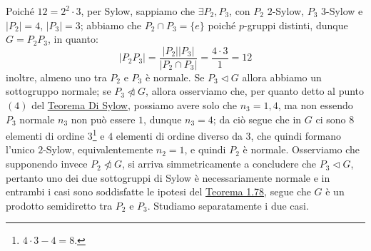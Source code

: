 \documentclass[11pt]{scrartcl}
\begin{document}
\begin{example}
    Poiché $12 = 2^2 \cdot 3$, per Sylow, sappiamo che $\exists P_2,P_3$, con $P_2$ $2$-Sylow, $P_3$ $3$-Sylow e $|P_2| = 4$, $|P_3| = 3$;
    abbiamo che $P_2 \cap P_3 = \{e\}$ poiché $p$-gruppi distinti, dunque $G = P_2P_3$, in quanto:
        \[ |P_2P_3| = \frac{|P_2||P_3|}{|P_2 \cap P_3|} = \frac{4 \cdot 3}{1} = 12
            \]
    inoltre, almeno uno tra $P_2$ e $P_3$ è normale. Se $P_3 \triangleleft G$ allora abbiamo un sottogruppo normale; se $P_3 \ntriangleleft G$, allora osserviamo che, per quanto detto al punto $(4)$
    del \hyperref[Sylow]{Teorema Di Sylow}, possiamo avere solo che $n_3 = 1,4$, ma non essendo $P_3$ normale $n_3$ non può essere $1$, dunque $n_3 = 4$;
    da ciò segue che in $G$ ci sono $8$ elementi di ordine $3$\footnote{$4 \cdot 3 - 4 = 8$.} e $4$ elementi di ordine diverso da $3$, che quindi formano 
    l'unico $2$-Sylow, equivalentemente $n_2 = 1$, e quindi $P_2$ è normale. Osserviamo che supponendo invece $P_2 \ntriangleleft G$, si arriva simmetricamente a concludere
    che $P_3 \triangleleft G$, pertanto uno dei due sottogruppi di Sylow è necessariamente normale e in entrambi i casi sono soddisfatte le ipotesi del \hyperref[t:1.78]{Teorema 1.78},
    segue che $G$ è un prodotto semidiretto tra $P_2$ e $P_3$. Studiamo separatamente i due casi.
\end{example}
\nopagebreak 
\end{document}
